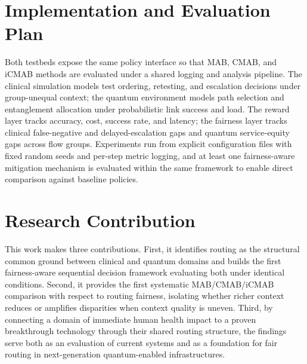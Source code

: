 \documentclass{IEEEtran}
\begin{document}
\section{Implementation and Evaluation Plan}

Both testbeds expose the same policy interface so that MAB, CMAB, and iCMAB
methods are evaluated under a shared logging and analysis pipeline. The
clinical simulation models test ordering, retesting, and escalation decisions
under group-unequal context; the quantum environment models path selection
and entanglement allocation under probabilistic link success and load. The
reward layer tracks accuracy, cost, success rate, and latency; the fairness
layer tracks clinical false-negative and delayed-escalation gaps and quantum
service-equity gaps across flow groups. Experiments run from explicit
configuration files with fixed random seeds and per-step metric logging,
and at least one fairness-aware mitigation mechanism is evaluated within the
same framework to enable direct comparison against baseline policies.

\section{Research Contribution}

This work makes three contributions. First, it identifies routing as the
structural common ground between clinical and quantum domains and builds the
first fairness-aware sequential decision framework evaluating both under
identical conditions. Second, it provides the first systematic MAB/CMAB/iCMAB
comparison with respect to routing fairness, isolating whether richer context
reduces or amplifies disparities when context quality is uneven. Third, by
connecting a domain of immediate human health impact to a proven breakthrough
technology through their shared routing structure, the findings serve both as
an evaluation of current systems and as a foundation for fair routing in
next-generation quantum-enabled infrastructures.
\end{document}
